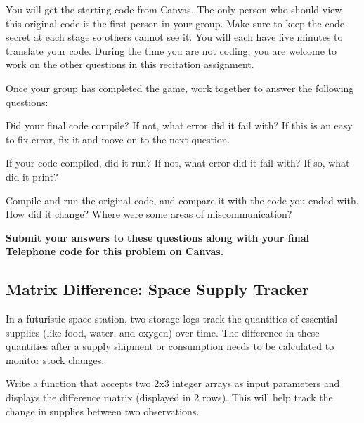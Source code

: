 You will get the starting code from Canvas. The only person who should view this original code is the first person in your group. Make sure to keep the code secret at each stage so others cannot see it. You will each have five minutes to translate your code. During the time you are not coding, you are welcome to work on the other questions in this recitation assignment. 

Once your group has completed the game, work together to answer the following questions:

\begin{multipart}
    Did your final code compile? If not, what error did it fail with? If this is an easy to fix error, fix it and move on to the next question.
\end{multipart}

\vspace{6cm}

\begin{multipart}
    If your code compiled, did it run? If not, what error did it fail with? If so, what did it print?
\end{multipart}

\vspace{6cm}

\begin{multipart}
    Compile and run the original code, and compare it with the code you ended with. How did it change? Where were some areas of miscommunication? 
\end{multipart}

\vspace{6cm}

\textbf{Submit your answers to these questions along with your final Telephone code for this problem on Canvas.}



\subsection{Matrix Difference: Space Supply Tracker}

In a futuristic space station, two storage logs track the quantities of essential supplies (like food, water, and oxygen) over time. The difference in these quantities after a supply shipment or consumption needs to be calculated to monitor stock changes.

Write a function that accepts two 2x3 integer arrays as input parameters and displays the difference matrix (displayed in 2 rows). This will help track the change in supplies between two observations.

